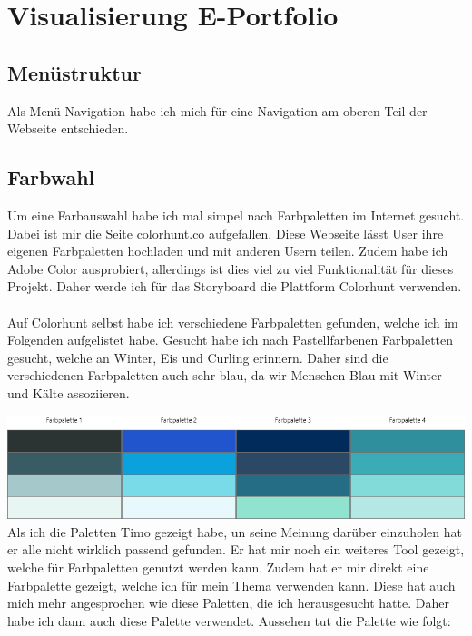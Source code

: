 \documentclass[11pt]{article}
\begin{document}
    \section{Visualisierung E-Portfolio}

    \subsection{Menüstruktur}
    Als Menü-Navigation habe ich mich für eine Navigation am oberen Teil der Webseite entschieden.

    \subsection{Farbwahl}
    Um eine Farbauswahl habe ich mal simpel nach Farbpaletten im Internet gesucht. Dabei ist mir die Seite
    \url{colorhunt.co} aufgefallen. Diese Webseite lässt User ihre eigenen Farbpaletten hochladen und mit
    anderen Usern teilen. Zudem habe ich Adobe Color ausprobiert, allerdings ist dies viel zu viel
    Funktionalität für dieses Projekt. Daher werde ich für das Storyboard die Plattform Colorhunt verwenden.\\
    \\
    Auf Colorhunt selbst habe ich verschiedene Farbpaletten gefunden, welche ich im Folgenden aufgelistet
    habe. Gesucht habe ich nach Pastellfarbenen Farbpaletten gesucht, welche an Winter, Eis und Curling erinnern.
    Daher sind die verschiedenen Farbpaletten auch sehr blau, da wir Menschen Blau mit Winter und Kälte
    assoziieren.

    \includegraphics[width=\textwidth]{media/color_palettes}
    Als ich die Paletten Timo gezeigt habe, un seine Meinung darüber einzuholen hat er alle nicht wirklich passend
    gefunden. Er hat mir noch ein weiteres Tool gezeigt, welche für Farbpaletten genutzt werden kann. Zudem hat er
    mir direkt eine Farbpalette gezeigt, welche ich für mein Thema verwenden kann. Diese hat auch mich mehr
    angesprochen wie diese Paletten, die ich herausgesucht hatte. Daher habe ich dann auch diese Palette verwendet.
    Aussehen tut die Palette wie folgt:
\end{document}
